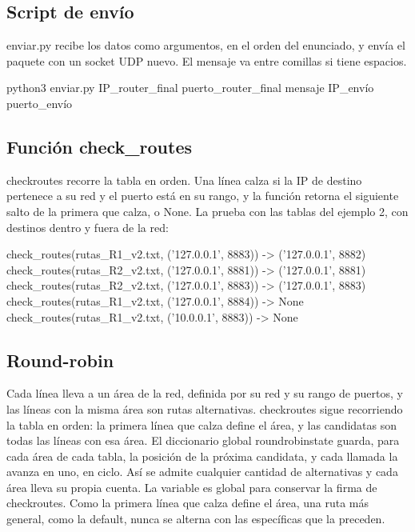 \documentclass[
	spanish, %
	letterpaper, oneside
]{article}
\newcommand{\codeunderscore}{\textunderscore\allowbreak}
\newcommand{\code}[1]{{\let\_\codeunderscore#1}}     %
\begin{document}
\subsection{Script de envío}
\code{enviar.py} recibe los datos como argumentos, en el orden del enunciado, y envía el paquete con un socket UDP nuevo. El mensaje va entre comillas si tiene espacios.
\begin{salida}
python3 enviar.py IP_router_final puerto_router_final mensaje IP_envío puerto_envío
\end{salida}

\subsection{Función check\_routes}
\code{check\_routes} recorre la tabla en orden. Una línea calza si la IP de destino pertenece a su red y el puerto está en su rango, y la función retorna el siguiente salto de la primera que calza, o \code{None}. La prueba con las tablas del ejemplo 2, con destinos dentro y fuera de la red:
\begin{salida}
check_routes(rutas_R1_v2.txt, ('127.0.0.1', 8883)) -> ('127.0.0.1', 8882)
check_routes(rutas_R2_v2.txt, ('127.0.0.1', 8881)) -> ('127.0.0.1', 8881)
check_routes(rutas_R2_v2.txt, ('127.0.0.1', 8883)) -> ('127.0.0.1', 8883)
check_routes(rutas_R1_v2.txt, ('127.0.0.1', 8884)) -> None
check_routes(rutas_R1_v2.txt, ('10.0.0.1', 8883)) -> None
\end{salida}

\subsection{Round-robin}
\label{sec:round-robin}
Cada línea lleva a un área de la red, definida por su red y su rango de puertos, y las líneas con la misma área son rutas alternativas. \code{check\_routes} sigue recorriendo la tabla en orden: la primera línea que calza define el área, y las candidatas son todas las líneas con esa área. El diccionario global \code{round\_robin\_state} guarda, para cada área de cada tabla, la posición de la próxima candidata, y cada llamada la avanza en uno, en ciclo. Así se admite cualquier cantidad de alternativas y cada área lleva su propia cuenta. La variable es global para conservar la firma de \code{check\_routes}. Como la primera línea que calza define el área, una ruta más general, como la default, nunca se alterna con las específicas que la preceden.
\end{document}
